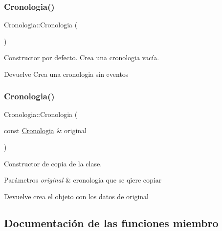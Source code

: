 \subsubsection{\texorpdfstring{Cronologia()}{Cronologia()}\hspace{0.1cm}{\footnotesize\ttfamily [1/2]}}
{\footnotesize\ttfamily Cronologia\+::\+Cronologia (\begin{DoxyParamCaption}{ }\end{DoxyParamCaption})}



Constructor por defecto. Crea una cronologia vacía. 

\begin{DoxyReturn}{Devuelve}
Crea una cronologia sin eventos 
\end{DoxyReturn}
\mbox{\label{classCronologia_a4de4592918375f3053acee2317dcc711}} 
\subsubsection{\texorpdfstring{Cronologia()}{Cronologia()}\hspace{0.1cm}{\footnotesize\ttfamily [2/2]}}
{\footnotesize\ttfamily Cronologia\+::\+Cronologia (\begin{DoxyParamCaption}\item[{const \hyperlink{classCronologia}{Cronologia} \&}]{original }\end{DoxyParamCaption})}



Constructor de copia de la clase. 


\begin{DoxyParams}{Parámetros}
{\em original} & cronologia que se qiere copiar \\
\hline
\end{DoxyParams}
\begin{DoxyReturn}{Devuelve}
crea el objeto con los datos de original 
\end{DoxyReturn}


\subsection{Documentación de las funciones miembro}
\mbox{\label{classCronologia_a074d231653a08d759ddeb6e5788029f9}} 
